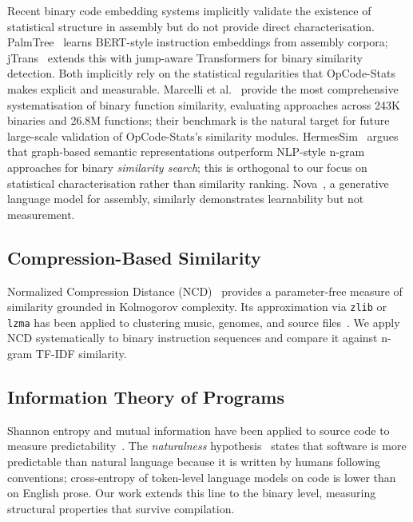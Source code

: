 \documentclass[10pt,twocolumn]{article}
\newcommand{\zlib}{\texttt{zlib}}
\newcommand{\lzma}{\texttt{lzma}}
\begin{document}
Recent binary code embedding systems implicitly validate the existence of
statistical structure in assembly but do not provide direct characterisation.
PalmTree~\cite{li2021palmtree} learns BERT-style instruction embeddings from
assembly corpora; jTrans~\cite{wang2022jtrans} extends this with jump-aware
Transformers for binary similarity detection.  Both implicitly rely on the
statistical regularities that OpCode-Stats makes explicit and measurable.
Marcelli et al.~\cite{marcelli2022machine} provide the most comprehensive
systematisation of binary function similarity, evaluating approaches across
243K binaries and 26.8M functions; their benchmark is the natural target for
future large-scale validation of OpCode-Stats's similarity modules.
HermesSim~\cite{hermessim2024} argues that graph-based semantic
representations outperform NLP-style n-gram approaches for binary
\emph{similarity search}; this is orthogonal to our focus on
statistical characterisation rather than similarity ranking.
Nova~\cite{nova2025}, a generative language model for assembly, similarly
demonstrates learnability but not measurement.

\subsection{Compression-Based Similarity}

Normalized Compression Distance (NCD)~\cite{cilibrasi2005clustering} provides
a parameter-free measure of similarity grounded in Kolmogorov complexity.  Its
approximation via \zlib{} or \lzma{} has been applied to clustering music,
genomes, and source files~\cite{cilibrasi2005clustering}.  We apply NCD
systematically to binary instruction sequences and compare it against n-gram
TF-IDF similarity.

\subsection{Information Theory of Programs}

Shannon entropy and mutual information have been applied to source code to
measure predictability~\cite{hindle2012naturalness,tu2014localness}.  The
\emph{naturalness} hypothesis~\cite{hindle2012naturalness} states that
software is more predictable than natural language because it is written by
humans following conventions; cross-entropy of token-level language models on
code is lower than on English prose.  Our work extends this line to the
binary level, measuring structural properties that survive compilation.
\end{document}
